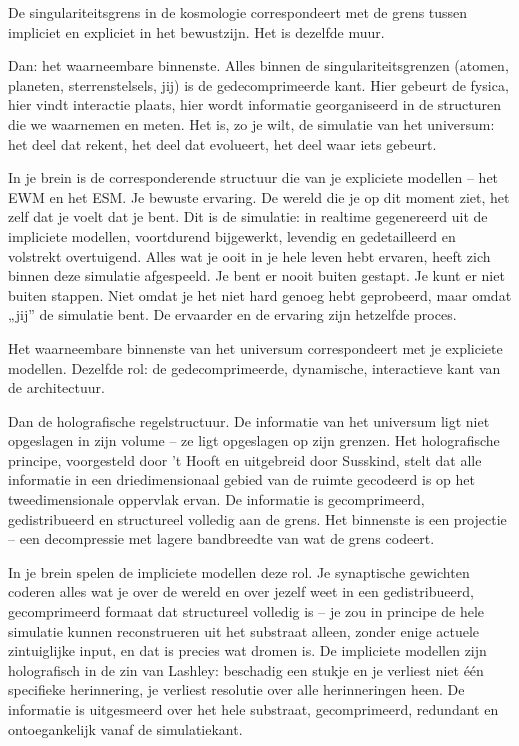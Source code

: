\documentclass[11pt, twoside, openright]{book}
\begin{document}
De singulariteitsgrens in de kosmologie correspondeert met de grens tussen impliciet en expliciet in het bewustzijn. Het is dezelfde muur.

Dan: het waarneembare binnenste. Alles binnen de singulariteitsgrenzen (atomen, planeten, sterrenstelsels, jij) is de gedecomprimeerde kant. Hier gebeurt de fysica, hier vindt interactie plaats, hier wordt informatie georganiseerd in de structuren die we waarnemen en meten. Het is, zo je wilt, de simulatie van het universum: het deel dat rekent, het deel dat evolueert, het deel waar iets gebeurt.

In je brein is de corresponderende structuur die van je expliciete modellen -- het EWM en het ESM. Je bewuste ervaring. De wereld die je op dit moment ziet, het zelf dat je voelt dat je bent. Dit is de simulatie: in realtime gegenereerd uit de impliciete modellen, voortdurend bijgewerkt, levendig en gedetailleerd en volstrekt overtuigend. Alles wat je ooit in je hele leven hebt ervaren, heeft zich binnen deze simulatie afgespeeld. Je bent er nooit buiten gestapt. Je kunt er niet buiten stappen. Niet omdat je het niet hard genoeg hebt geprobeerd, maar omdat „jij” de simulatie bent. De ervaarder en de ervaring zijn hetzelfde proces.

Het waarneembare binnenste van het universum correspondeert met je expliciete modellen. Dezelfde rol: de gedecomprimeerde, dynamische, interactieve kant van de architectuur.

Dan de holografische regelstructuur. De informatie van het universum ligt niet opgeslagen in zijn volume -- ze ligt opgeslagen op zijn grenzen. Het holografische principe, voorgesteld door 't Hooft en uitgebreid door Susskind, stelt dat alle informatie in een driedimensionaal gebied van de ruimte gecodeerd is op het tweedimensionale oppervlak ervan. De informatie is gecomprimeerd, gedistribueerd en structureel volledig aan de grens. Het binnenste is een projectie -- een decompressie met lagere bandbreedte van wat de grens codeert.

In je brein spelen de impliciete modellen deze rol. Je synaptische gewichten coderen alles wat je over de wereld en over jezelf weet in een gedistribueerd, gecomprimeerd formaat dat structureel volledig is -- je zou in principe de hele simulatie kunnen reconstrueren uit het substraat alleen, zonder enige actuele zintuiglijke input, en dat is precies wat dromen is. De impliciete modellen zijn holografisch in de zin van Lashley: beschadig een stukje en je verliest niet één specifieke herinnering, je verliest resolutie over alle herinneringen heen. De informatie is uitgesmeerd over het hele substraat, gecomprimeerd, redundant en ontoegankelijk vanaf de simulatiekant.
\end{document}

